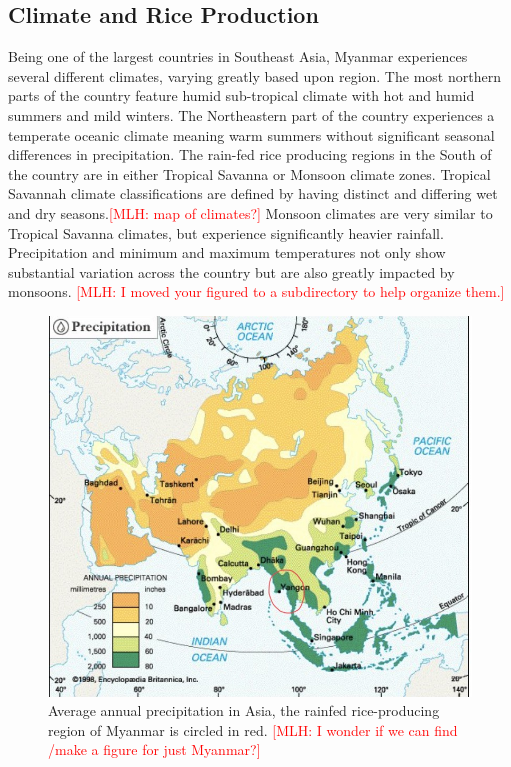 \documentclass{book}\usepackage{knitr}
\newcommand{\red}[1]{\textcolor{red}{[MLH: #1]}}
\begin{document}
\begin{knitrout}
\begin{kframe}
{\section{Climate and Rice Production}
Being one of the largest countries in Southeast Asia, Myanmar experiences several different climates, varying greatly based upon region. The most northern parts of the country feature humid sub-tropical climate with hot and humid summers and mild winters. The Northeastern part of the country experiences a temperate oceanic climate meaning warm summers without significant seasonal differences in precipitation. The rain-fed rice producing regions in the South of the country are in either Tropical Savanna or Monsoon climate zones. Tropical Savannah climate classifications are defined by having distinct and differing wet and dry seasons.\red{map of climates?} Monsoon climates are very similar to Tropical Savanna climates, but experience significantly heavier rainfall. Precipitation and minimum and maximum temperatures not only show substantial variation across the country but are also greatly impacted by monsoons. 
\red{I moved your figured to a subdirectory to help organize them.}
\begin{figure}
\includegraphics[width=\linewidth]{images/myanmar/Image1.jpg}
\caption{Average annual precipitation in Asia, the rainfed rice-producing region of Myanmar is circled in red. \red{I wonder if we can find /make a figure for just Myanmar?}}
\end{figure}



}
\end{kframe}
\end{knitrout}
\end{document}
